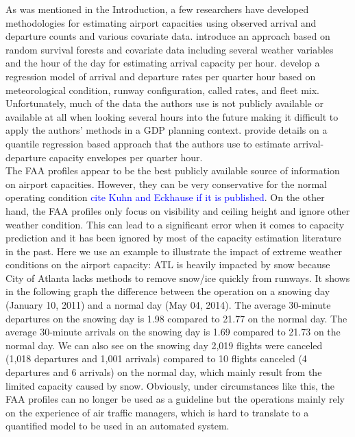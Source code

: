 \documentclass[12pt]{article}
\begin{document}
	\newline
	As was mentioned in the Introduction, a few researchers have developed methodologies for estimating airport capacities using observed arrival and departure counts and various covariate data. \cite{gorripaty} introduce an approach based on random survival forests and covariate data including several weather variables and the hour of the day for estimating arrival capacity per hour. \cite{kim} develop a regression model of arrival and departure rates per quarter hour based on meteorological condition, runway configuration, called rates, and fleet mix.  Unfortunately, much of the data the authors use is not publicly available or available at all when looking several hours into the future making it difficult to apply the authors' methods in a GDP planning context. \cite{ramnujam} provide details on a quantile regression based approach that the authors use to estimate arrival-departure capacity envelopes per quarter hour.\\
	\newline
	The FAA profiles appear to be the best publicly available source of information on airport capacities. However, they can be very conservative for the normal operating condition \textcolor{blue}{cite Kuhn and Eckhause if it is published}. On the other hand, the FAA profiles only focus on visibility and ceiling height and ignore other weather condition. This can lead to a significant error when it comes to capacity prediction and it has been ignored by most of the capacity estimation literature in the past. Here we use an example to illustrate the impact of extreme weather conditions on the airport capacity: ATL is heavily impacted by snow because City of Atlanta lacks methods to remove snow/ice quickly from runways. It shows in the following graph the difference between the operation on a snowing day (January 10, 2011) and a normal day (May 04, 2014). The average 30-minute departures on the snowing day is 1.98 compared to 21.77 on the normal day. The average 30-minute arrivals on the snowing day is 1.69 compared to 21.73 on the normal day. We can also see on the snowing day 2,019 flights were canceled (1,018 departures and 1,001 arrivals) compared to 10 flights canceled (4 departures and 6 arrivals) on the normal day, which mainly result from the limited capacity caused by snow. Obviously, under circumstances like this, the FAA profiles can no longer be used as a guideline but the operations mainly rely on the experience of air traffic managers, which is hard to translate to a quantified model to be used in an automated system.
\end{document}
